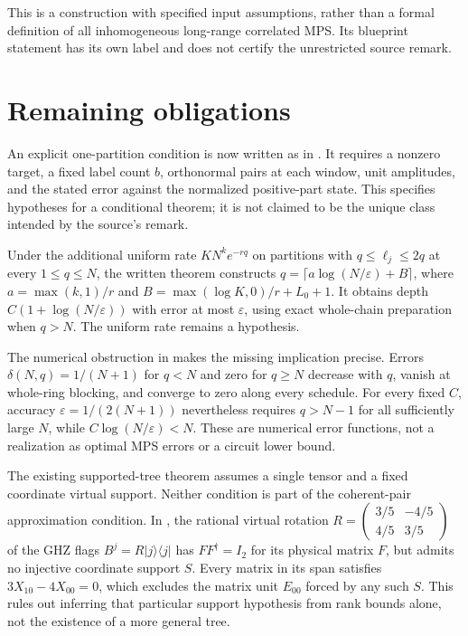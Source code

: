\documentclass{article}
\begin{document}
This is a construction with specified input assumptions, rather than a
formal definition of all inhomogeneous long-range correlated MPS. Its
blueprint statement has its own label and does not certify the unrestricted
source remark.

\section{Remaining obligations}
An explicit one-partition condition is now written as
 in
. It requires a
nonzero target, a fixed label count $b$, orthonormal pairs at each window,
unit amplitudes, and the stated error against the normalized positive-part
state. This specifies hypotheses for a conditional theorem; it is not
claimed to be the unique class intended by the source's remark.

Under the additional uniform rate $KN^ke^{-rq}$ on partitions with
$q\le\ell_j\le2q$ at every $1\le q\le N$, the written theorem constructs
$q=\lceil a\log(N/\varepsilon)+B\rceil$, where
$a=\max(k,1)/r$ and $B=\max(\log K,0)/r+L_0+1$. It obtains depth
$C(1+\log(N/\varepsilon))$ with error at most $\varepsilon$, using exact
whole-chain preparation when $q>N$. The uniform rate remains a hypothesis.

The numerical obstruction in
 makes the
missing implication precise. Errors $\delta(N,q)=1/(N+1)$ for $q<N$ and
zero for $q\ge N$ decrease with $q$, vanish at whole-ring blocking, and
converge to zero along every schedule. For every fixed $C$, accuracy
$\varepsilon=1/(2(N+1))$ nevertheless requires $q>N-1$ for all sufficiently
large $N$, while $C\log(N/\varepsilon)<N$. These are numerical error
functions, not a realization as optimal MPS errors or a circuit lower bound.

The existing supported-tree theorem assumes a single tensor and a fixed
coordinate virtual support. Neither condition is part of the coherent-pair
approximation condition. In
, the rational virtual
rotation $R=\left(\begin{smallmatrix}3/5&-4/5\\4/5&3/5\end{smallmatrix}\right)$
of the GHZ flags $B^j=R|j\rangle\langle j|$ has $FF^\dagger=I_2$ for its
physical matrix $F$, but admits no injective coordinate support $S$.
Every matrix in its span satisfies $3X_{10}-4X_{00}=0$, which excludes the
matrix unit $E_{00}$ forced by any such $S$. This rules out inferring that
particular support hypothesis from rank bounds alone, not the existence
of a more general tree.
\end{document}
